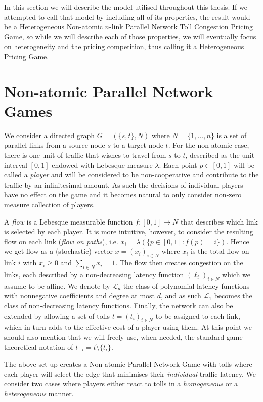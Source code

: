 \documentclass[10pt,a4paper]{book}
\theoremstyle{definition}
\theoremstyle{comment}
\begin{document}
In this section we will describe the model utilised throughout this thesis.
If we attempted to call that model by including all of its properties, the result would be a Heterogeneous Non-atomic $n$-link Parallel Network Toll Congestion Pricing Game, so while we will describe each of those properties, we will eventually focus on heterogeneity and the pricing competition, thus calling it a Heterogeneous Pricing Game.

\section*{Non-atomic Parallel Network Games}

We consider a directed graph $G = (\{s, t\}, N)$ where $N = \{1,\dots, n\}$ is a set of parallel links from a source node $s$ to a target node $t$.
For the non-atomic case, there is one unit of traffic that wishes to travel from $s$ to $t$, described as the unit interval $[0, 1]$ endowed with Lebesque measure $\lambda$.
Each point $p \in [0, 1]$ will be called a \textit{player} and will be considered to be non-cooperative and contribute to the traffic by an infinitesimal amount.
As such the decisions of individual players have no effect on the game and it becomes natural to only consider non-zero measure collection of players.

A \textit{flow} is a Lebesque measurable function $f: [0, 1] \rightarrow N$ that describes which link is selected by each player.
It is more intuitive, however, to consider the resulting flow on each link (\textit{flow on paths}), i.e. $x_i = \lambda(\{p \in [0, 1]: f(p) = i\})$.
Hence we get flow as a (stochastic) vector $x = (x_i)_{i \in N}$ where $x_i$ is the total flow on link $i$ with $x_i \geq 0$ and $\sum_{i \in N}x_i = 1$.
The flow then creates congestion on the links, each described by a non-decreasing latency function $(\ell_i)_{i \in N}$ which we assume to be affine.
We denote by $\mathcal{L}_d$ the class of polynomial latency functions with nonnegative coefficients and degree at most $d$, and as such $\mathcal{L}_1$ becomes the class of non-decreasing latency functions.
Finally, the network can also be extended by allowing a set of tolls $t = (t_i)_{i \in N}$ to be assigned to each link, which in turn adds to the effective cost of a player using them.
At this point we should also mention that we will freely use, when needed, the standard game-theoretical notation of $t_{-i} = t \setminus \{t_i\}$.

The above set-up creates a Non-atomic Parallel Network Game with tolls where each player will select the edge that minimises their \textit{individual} traffic latency.
We consider two cases where players either react to tolls in a \textit{homogeneous} or a \textit{heterogeneous} manner.
\end{document}
